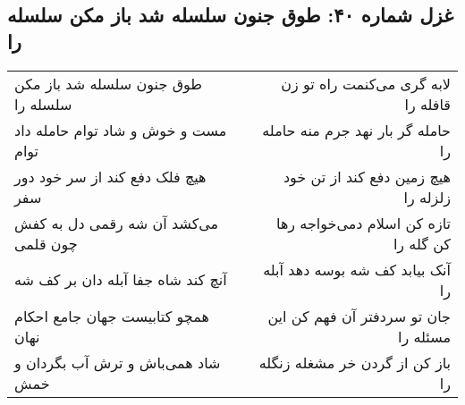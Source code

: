 \begin{center}
\section*{غزل شماره ۴۰: طوق جنون سلسله شد باز مکن سلسله را}
\label{sec:0040}
\begin{longtable}{l p{0.5cm} r}
طوق جنون سلسله شد باز مکن سلسله را
&&
لابه گری می‌کنمت راه تو زن قافله را
\\
مست و خوش و شاد توام حامله داد توام
&&
حامله گر بار نهد جرم منه حامله را
\\
هیچ فلک دفع کند از سر خود دور سفر
&&
هیچ زمین دفع کند از تن خود زلزله را
\\
می‌کشد آن شه رقمی دل به کفش چون قلمی
&&
تازه کن اسلام دمی‌خواجه رها کن گله را
\\
آنچ کند شاه جفا آبله دان بر کف شه
&&
آنک بیابد کف شه بوسه دهد آبله را
\\
همچو کتابیست جهان جامع احکام نهان
&&
جان تو سردفتر آن فهم کن این مسئله را
\\
شاد همی‌باش و ترش آب بگردان و خمش
&&
باز کن از گردن خر مشغله زنگله را
\\
\end{longtable}
\end{center}
